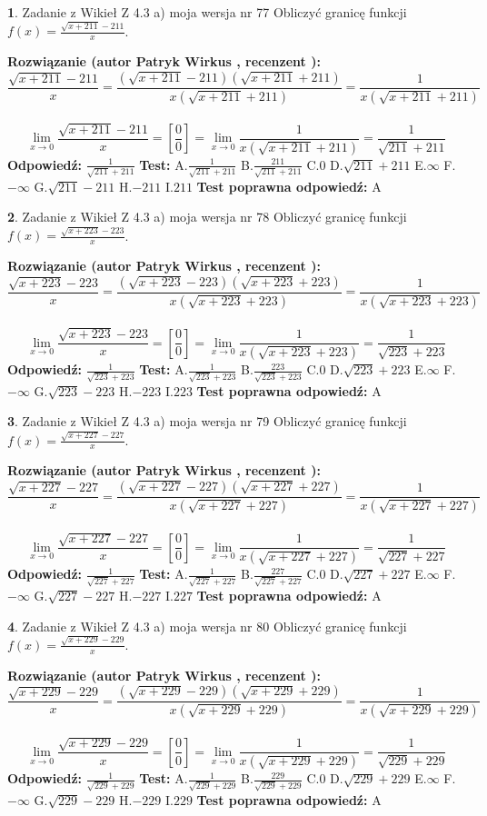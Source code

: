 \documentclass[12pt, a4paper]{article}
\theoremstyle{definition} %
\newtheorem{zad}{}
\newcommand{\zadStart}[1]{\begin{zad}#1\newline}
\newcommand{\zadStop}{\end{zad}}
\newcommand{\rozwStart}[2]{\noindent \textbf{Rozwiązanie (autor #1 , recenzent #2): }\newline}
\newcommand{\rozwStop}{\newline}
\newcommand{\odpStart}{\noindent \textbf{Odpowiedź:}\newline}
\newcommand{\odpStop}{\newline}
\newcommand{\testStart}{\noindent \textbf{Test:}\newline}
\newcommand{\testStop}{\newline}
\newcommand{\kluczStart}{\noindent \textbf{Test poprawna odpowiedź:}\newline}
\newcommand{\kluczStop}{\newline}
\begin{document}
\zadStart{Zadanie z Wikieł Z 4.3 a) moja wersja nr 77}
Obliczyć granicę funkcji $f(x)=\frac{\sqrt{x+211}-211}{x}$.
\zadStop
\rozwStart{Patryk Wirkus}{}
$$\frac{\sqrt{x+211}-211}{x}=\frac{(\sqrt{x+211}-211)(\sqrt{x+211}+211)}{x(\sqrt{x+211}+211)}=\frac{1}{x(\sqrt{x+211}+211)}$$
\\
$$\lim\limits_{x\to0}\frac{\sqrt{x+211}-211}{x}=[\frac{0}{0}]=
\lim\limits_{x\to0}\frac{1}{x(\sqrt{x+211}+211)} = \frac{1}{\sqrt{211}+211}$$
\rozwStop
\odpStart
$\frac{1}{\sqrt{211}+211}$
\odpStop
\testStart
A.$\frac{1}{\sqrt{211}+211}$
B.$\frac{211}{\sqrt{211}+211}$
C.$0$
D.$\sqrt{211}+211$
E.$\infty$
F.$-\infty$
G.$\sqrt{211}-211$
H.$-211$
I.$211$
\testStop
\kluczStart
A
\kluczStop



\zadStart{Zadanie z Wikieł Z 4.3 a) moja wersja nr 78}
Obliczyć granicę funkcji $f(x)=\frac{\sqrt{x+223}-223}{x}$.
\zadStop
\rozwStart{Patryk Wirkus}{}
$$\frac{\sqrt{x+223}-223}{x}=\frac{(\sqrt{x+223}-223)(\sqrt{x+223}+223)}{x(\sqrt{x+223}+223)}=\frac{1}{x(\sqrt{x+223}+223)}$$
\\
$$\lim\limits_{x\to0}\frac{\sqrt{x+223}-223}{x}=[\frac{0}{0}]=
\lim\limits_{x\to0}\frac{1}{x(\sqrt{x+223}+223)} = \frac{1}{\sqrt{223}+223}$$
\rozwStop
\odpStart
$\frac{1}{\sqrt{223}+223}$
\odpStop
\testStart
A.$\frac{1}{\sqrt{223}+223}$
B.$\frac{223}{\sqrt{223}+223}$
C.$0$
D.$\sqrt{223}+223$
E.$\infty$
F.$-\infty$
G.$\sqrt{223}-223$
H.$-223$
I.$223$
\testStop
\kluczStart
A
\kluczStop



\zadStart{Zadanie z Wikieł Z 4.3 a) moja wersja nr 79}
Obliczyć granicę funkcji $f(x)=\frac{\sqrt{x+227}-227}{x}$.
\zadStop
\rozwStart{Patryk Wirkus}{}
$$\frac{\sqrt{x+227}-227}{x}=\frac{(\sqrt{x+227}-227)(\sqrt{x+227}+227)}{x(\sqrt{x+227}+227)}=\frac{1}{x(\sqrt{x+227}+227)}$$
\\
$$\lim\limits_{x\to0}\frac{\sqrt{x+227}-227}{x}=[\frac{0}{0}]=
\lim\limits_{x\to0}\frac{1}{x(\sqrt{x+227}+227)} = \frac{1}{\sqrt{227}+227}$$
\rozwStop
\odpStart
$\frac{1}{\sqrt{227}+227}$
\odpStop
\testStart
A.$\frac{1}{\sqrt{227}+227}$
B.$\frac{227}{\sqrt{227}+227}$
C.$0$
D.$\sqrt{227}+227$
E.$\infty$
F.$-\infty$
G.$\sqrt{227}-227$
H.$-227$
I.$227$
\testStop
\kluczStart
A
\kluczStop



\zadStart{Zadanie z Wikieł Z 4.3 a) moja wersja nr 80}
Obliczyć granicę funkcji $f(x)=\frac{\sqrt{x+229}-229}{x}$.
\zadStop
\rozwStart{Patryk Wirkus}{}
$$\frac{\sqrt{x+229}-229}{x}=\frac{(\sqrt{x+229}-229)(\sqrt{x+229}+229)}{x(\sqrt{x+229}+229)}=\frac{1}{x(\sqrt{x+229}+229)}$$
\\
$$\lim\limits_{x\to0}\frac{\sqrt{x+229}-229}{x}=[\frac{0}{0}]=
\lim\limits_{x\to0}\frac{1}{x(\sqrt{x+229}+229)} = \frac{1}{\sqrt{229}+229}$$
\rozwStop
\odpStart
$\frac{1}{\sqrt{229}+229}$
\odpStop
\testStart
A.$\frac{1}{\sqrt{229}+229}$
B.$\frac{229}{\sqrt{229}+229}$
C.$0$
D.$\sqrt{229}+229$
E.$\infty$
F.$-\infty$
G.$\sqrt{229}-229$
H.$-229$
I.$229$
\testStop
\kluczStart
A
\kluczStop
\end{document}
